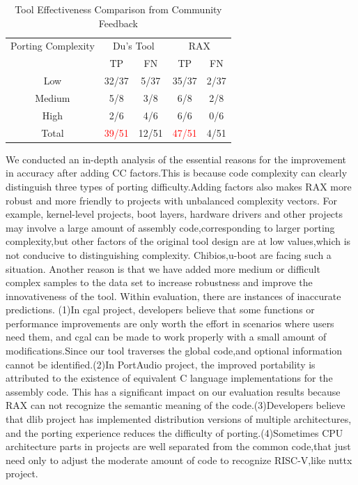 \documentclass[sigconf,screen,review,anonymous]{acmart}
\begin{document}
{\begin{table}
  \caption{Tool Effectiveness Comparison from Community Feedback}
  \label{tab:effectiveness}
  \begin{tabular}{ccccc}
    \toprule
    Porting Complexity & \multicolumn{2}{c}{Du's Tool} & \multicolumn{2}{c}{RAX} \\
     & TP & FN & TP & FN \\
    \midrule
    Low &32/37 & 5/37 & 35/37 & 2/37 \\
    Medium & 5/8 & 3/8 & 6/8 & 2/8 \\
    High & 2/6 & 4/6 & 6/6 & 0/6 \\
    \midrule
    Total & \textcolor{red}{39/51} & 12/51& \textcolor{red}{47/51} & 4/51 \\
      \bottomrule
\end{tabular}
\end{table}

We conducted an in-depth analysis of the essential reasons for the improvement in accuracy after adding CC factors.This is because code complexity can clearly distinguish three types of porting difficulty.Adding factors also makes RAX more robust and more friendly to projects with unbalanced complexity vectors.
For example, kernel-level projects, boot layers, hardware drivers and other projects may involve a large amount of assembly code,corresponding to larger porting complexity,but other factors of the original tool design are at low values,which is not conducive to distinguishing complexity.
Chibios,u-boot are facing such a situation. Another reason is that we have added more medium or difficult complex samples to the data set to increase robustness and improve the innovativeness of the tool. Within evaluation, there are instances of inaccurate predictions. (1)In cgal project, developers believe that some functions or performance improvements are only worth the effort in scenarios where users need them, and cgal can be made to work properly with a small amount of modifications.Since our tool traverses the global code,and optional information cannot be identified.(2)In PortAudio project, the improved portability is attributed to the existence of equivalent C language implementations for the assembly code. This has a significant impact on our evaluation results because RAX can not recognize the semantic meaning of the code.(3)Developers believe that dlib project has implemented distribution versions of multiple architectures, and the porting experience reduces the difficulty of porting.(4)Sometimes CPU architecture parts in projects are well separated from the common code,that just need only to adjust the moderate amount of code to recognize RISC-V,like nuttx project.
}
\end{document}
